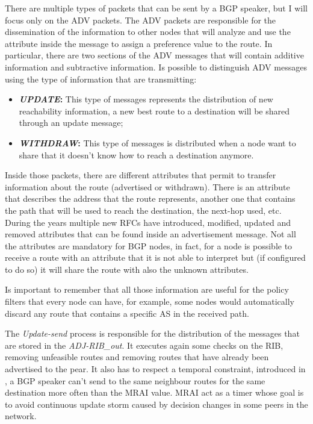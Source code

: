 There are multiple types of packets that can be sent by a \ac{BGP} speaker, but
I will focus only on the \ac{ADV} packets.
The \ac{ADV} packets are responsible for the dissemination of the information
to other nodes that will analyze and use the attribute inside the message
to assign a preference value to the route.
In particular, there are two sections of the \ac{ADV} messages that will
contain additive information and subtractive information.
Is possible to distinguish \ac{ADV} messages using the type of information that are
transmitting:
\begin{itemize}
	\item \textbf{\textit{UPDATE}:} This type of messages represents the distribution
		of new reachability information, a new best route to a destination will be
		shared through an update message;
	\item \textbf{\textit{WITHDRAW}:} This type of messages is distributed when
		a node want to share that it doesn't know how to reach
		a destination anymore.
\end{itemize}
Inside those packets, there are different attributes that permit to transfer
information about the route (advertised or withdrawn).
There is an attribute that describes the address that the route represents,
another one that contains the path that will be used to reach the
destination, the next-hop used, etc.
During the years multiple new \acp{RFC} have introduced, modified, updated and removed
attributes that can be found inside an advertisement message.
Not all the attributes are mandatory for \ac{BGP} nodes, in fact, for a node
is possible to receive a route with an attribute that it is not able to interpret
but (if configured to do so) it will share the route with also the unknown
attributes.

Is important to remember that all those information are useful for the policy
filters that every node can have, for example, some nodes would automatically discard
any route that contains a specific \ac{AS} in the received path.

The \textit{Update-send} process is responsible for the distribution of the
messages that are stored in the \textit{ADJ-RIB\_out}.
It executes again some checks on the \ac{RIB}, removing unfeasible routes
and removing routes that have already been advertised to the pear.
It also has to respect a temporal constraint, introduced in \cite{rfc4271},
a \ac{BGP} speaker can't send to the same neighbour routes for the same destination
more often than the \ac{MRAI} value.
\ac{MRAI} act as a timer whose goal is to avoid continuous update storm caused
by decision changes in some peers in the network.

